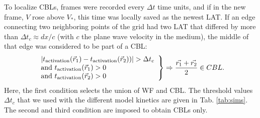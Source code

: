 \documentclass{article}
\newcommand{\tact}{\ensuremath{t_{\rm activation}}}
\newcommand{\VS}{V_*}
\begin{document}

To localize CBLs, frames were recorded every $\Delta t$ time units, and if in the new frame, $V$ rose above $\VS$, this time was locally saved as the newest LAT. If an edge connecting two neighboring points of the grid had two LAT that differed by more than $\Delta t_c \approx dx/c$ (with $c$ the plane wave velocity in the medium), the middle of that edge was considered to be part of a CBL: 
\begin{align}
\left. \begin{array}{l} 
| \tact(\vec{r}_1) - \tact(\vec{r}_2)) | > \Delta t_c  \\
\mathrm{and} \ \tact(\vec{r}_1) > 0 \\
\mathrm{and} \ \tact(\vec{r}_2) > 0 
\end{array} \right\}
\Rightarrow \frac{\vec{r_1} + \vec{r_2}}{2} \in CBL. \label{CBLdetection}
\end{align}
Here, the first condition selects the union of WF and CBL. The threshold values $\Delta t_c$ that we used with the different model kinetics are given in Tab. \ref{tab:sims}. The second and third condition are imposed to obtain CBLs only. 
\end{document}
